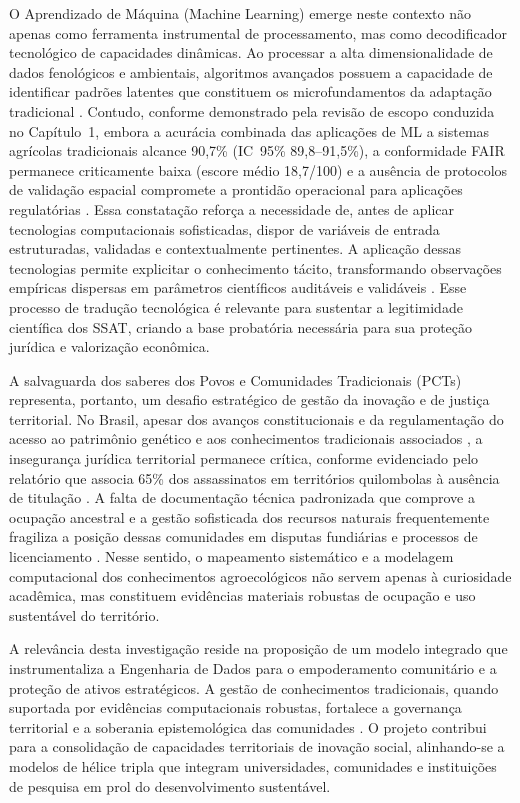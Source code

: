 O Aprendizado de Máquina (Machine Learning) emerge neste contexto não apenas como ferramenta instrumental de processamento, mas como decodificador tecnológico de capacidades dinâmicas. Ao processar a alta dimensionalidade de dados fenológicos e ambientais, algoritmos avançados possuem a capacidade de identificar padrões latentes que constituem os microfundamentos da adaptação tradicional \cite{Mountrakis2011,Spyrou2025}. Contudo, conforme demonstrado pela revisão de escopo conduzida no Capítulo~1, embora a acurácia combinada das aplicações de ML a sistemas agrícolas tradicionais alcance 90,7\% (IC~95\% 89,8--91,5\%), a conformidade FAIR permanece criticamente baixa (escore médio 18,7/100) e a ausência de protocolos de validação espacial compromete a prontidão operacional para aplicações regulatórias \cite{Wilkinson2016,Rudin2019}. Essa constatação reforça a necessidade de, antes de aplicar tecnologias computacionais sofisticadas, dispor de variáveis de entrada estruturadas, validadas e contextualmente pertinentes. A aplicação dessas tecnologias permite explicitar o conhecimento tácito, transformando observações empíricas dispersas em parâmetros científicos auditáveis e validáveis \cite{Nonaka1995}. Esse processo de tradução tecnológica é relevante para sustentar a legitimidade científica dos SSAT, criando a base probatória necessária para sua proteção jurídica e valorização econômica.

A salvaguarda dos saberes dos Povos e Comunidades Tradicionais (PCTs) representa, portanto, um desafio estratégico de gestão da inovação e de justiça territorial. No Brasil, apesar dos avanços constitucionais e da regulamentação do acesso ao patrimônio genético e aos conhecimentos tradicionais associados \cite{brasil2015lei13123}, a insegurança jurídica territorial permanece crítica, conforme evidenciado pelo relatório que associa 65\% dos assassinatos em territórios quilombolas à ausência de titulação \cite{conaq2023racismo}. A falta de documentação técnica padronizada que comprove a ocupação ancestral e a gestão sofisticada dos recursos naturais frequentemente fragiliza a posição dessas comunidades em disputas fundiárias e processos de licenciamento \cite{Santilli2009}. Nesse sentido, o mapeamento sistemático e a modelagem computacional dos conhecimentos agroecológicos não servem apenas à curiosidade acadêmica, mas constituem evidências materiais robustas de ocupação e uso sustentável do território.


A relevância desta investigação reside na proposição de um modelo integrado que instrumentaliza a Engenharia de Dados para o empoderamento comunitário e a proteção de ativos estratégicos. A gestão de conhecimentos tradicionais, quando suportada por evidências computacionais robustas, fortalece a governança territorial e a soberania epistemológica das comunidades \cite{FalsBorda1991}. O projeto contribui para a consolidação de capacidades territoriais de inovação social, alinhando-se a modelos de hélice tripla \cite{EtzkowitzLeydesdorff2000} que integram universidades, comunidades e instituições de pesquisa em prol do desenvolvimento sustentável.

